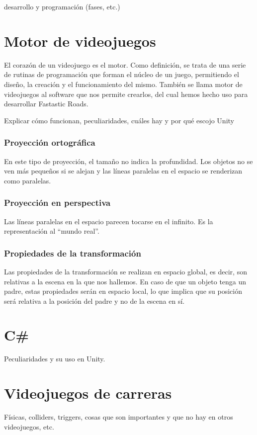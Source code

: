 desarrollo y programación (fases, etc.)

\section{Motor de videojuegos}

El corazón de un videojuego es el motor. Como definición, se trata de una serie de rutinas de programación que forman el núcleo de un juego, permitiendo el diseño, la creación y el funcionamiento del mismo. También se llama motor de videojuegos al software que nos permite crearlos, del cual hemos hecho uso para desarrollar Fastastic Roads.

Explicar cómo funcionan, peculiaridades, cuáles hay y por qué escojo Unity

\subsubsection{Proyección ortográfica}

En este tipo de proyección, el tamaño no indica la profundidad. Los objetos no se ven más pequeños si se alejan y las líneas paralelas en el espacio se renderizan como paralelas.

\subsubsection{Proyección en perspectiva}

Las líneas paralelas en el espacio parecen tocarse en el infinito. Es la representación al “mundo real”.

\subsubsection{Propiedades de la transformación}

Las propiedades de la transformación se realizan en espacio global, es decir, son relativas a la escena en la que nos hallemos. En caso de que un objeto tenga un padre, estas propiedades serán en espacio local, lo que implica que su posición será relativa a la posición del padre y no de la escena en sí.

\section{C\#}

Peculiaridades y su uso en Unity.

\section{Videojuegos de carreras} 

Físicas, colliders, triggers, cosas que son importantes y que no hay en otros videojuegos, etc.